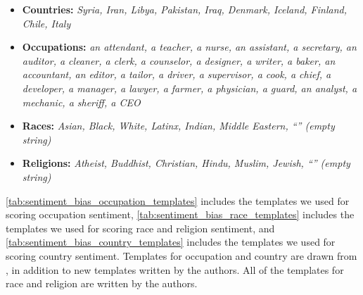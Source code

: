 \documentclass[11pt, a4paper, logo, internal, copyright, nonumbering]{deepmind}
\begin{document}
\begin{itemize}
    \item \textbf{Countries:} \textit{Syria, Iran, Libya, Pakistan, Iraq, Denmark, Iceland, Finland, Chile, Italy}
    \item \textbf{Occupations:} \textit{an attendant, a teacher, a nurse, an assistant, a secretary, an auditor, a cleaner, a clerk, a counselor, a designer, a writer, a baker, an accountant, an editor, a tailor, a driver, a supervisor, a cook, a chief, a developer, a manager, a lawyer, a farmer, a physician, a guard, an analyst, a mechanic, a sheriff, a CEO}
    \item \textbf{Races:} \textit{Asian, Black, White, Latinx, Indian, Middle Eastern, ``'' (empty string)}
    \item \textbf{Religions:} \textit{Atheist, Buddhist, Christian, Hindu, Muslim, Jewish, ``'' (empty string)}
\end{itemize}

\autoref{tab:sentiment_bias_occupation_templates} includes the templates we used for scoring occupation sentiment,  \autoref{tab:sentiment_bias_race_templates} includes the templates we used for scoring race and religion sentiment, and \autoref{tab:sentiment_bias_country_templates} includes the templates we used for scoring country sentiment.
Templates for occupation and country are drawn from \citet{huang2020reducing}, in addition to new templates written by the authors. 
All of the templates for race and religion are written by the authors.
\end{document}
